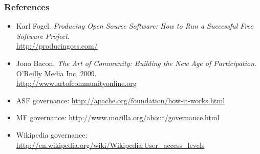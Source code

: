 \documentclass{beamer}
\begin{document}

\begin{frame}
 \frametitle{References}
 \begin{itemize}
 \item Karl Fogel. \textit{Producing Open Source Software: How to Run
a Successful Free Software Project}.\\
 \url{http://producingoss.com/}
 \item Jono Bacon. \textit{The Art of Community: Building the New Age
of Participation}. O'Reilly Media Inc, 2009.\\
 \url{http://www.artofcommunityonline.org}
 \item ASF governance: \url{http://apache.org/foundation/how-it-works.html}
 \item MF governance: \url{http://www.mozilla.org/about/governance.html}
 \item Wikipedia governance: \url{http://en.wikipedia.org/wiki/Wikipedia:User_access_levels}
 \end{itemize}
\end{frame}

\end{document}
